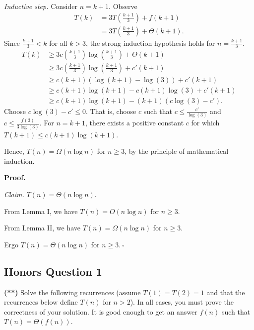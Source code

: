 \begin{enumerate}
\textit{Inductive step. }Consider $n=k+1$. Observe
\begin{align*}
T(k)&=3T\left(\frac{k+1}{3}\right)+f(k+1)\\
&=3T\left(\frac{k+1}{3}\right)+\Theta(k+1).
\end{align*}
Since $\frac{k+1}{3}<k$ for all $k>3$, the strong induction hypothesis holds for $n=\frac{k+1}{3}$.
\begin{align*}
T(k)&\geq 3c\left(\frac{k+1}{3}\right)\log\left(\frac{k+1}{3}\right)+\Theta(k+1)\\
&\geq 3c\left(\frac{k+1}{3}\right)\log\left(\frac{k+1}{3}\right)+c'(k+1)\\
&\geq c(k+1)(\log(k+1)-\log(3))+c'(k+1)\\
&\geq c(k+1)\log(k+1)-c(k+1)\log(3)+c'(k+1)\\
&\geq c(k+1)\log(k+1)-(k+1)(c\log(3)-c').
\end{align*}
Choose $c\log(3)-c'\leq 0$. That is, choose $c$ such that $c\leq\frac{c'}{\log(3)}$ and $c\leq\frac{f(3)}{3\log(3)}$. For $n=k+1$, there exists a positive constant $c$ for which $T(k+1)\leq c(k+1)\log(k+1)$. 

Hence, $T(n)=\Omega(n\log n)$ for $n\geq 3$, by the principle of mathematical induction.

\textbf{Proof. }

\textit{Claim. }$T(n)=\Theta(n\log n)$.

From Lemma I, we have $T(n)=O(n\log n)$ for $n\geq 3$.

From Lemma II, we have $T(n)=\Omega(n\log n)$ for $n\geq 3$.

Ergo $T(n)=\Theta(n\log n)$ for $n\geq 3$.$~\square$
\end{enumerate}
\newpage

\subsection*{Honors Question 1}
{\bf (**)}
Solve the following recurrences (assume $T(1)=T(2)=1$ and that the recurrences below define $T(n)$ for $n>2$). In all cases, you must prove the correctness of your solution. It is good enough to get an answer $f(n)$ such that $T(n)=\Theta(f(n))$.

